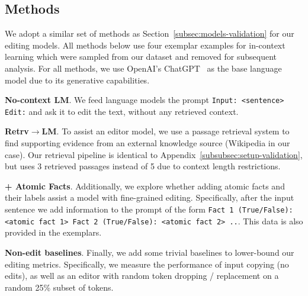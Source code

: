\documentclass[11pt]{article}
\newcommand{\rtgShort}{Retrv$\rightarrow$LM}
\begin{document}
\subsection{Methods}\label{subsubsec:editing-methods}

We adopt a similar set of methods as Section~\ref{subsec:models-validation} for our editing models. All methods below use four exemplar examples for in-context learning which were sampled from our dataset and removed for subsequent analysis. For all methods, we use OpenAI's ChatGPT~\citep{chatgpt} as the base language model due to its generative capabilities.
\vspace{.3em}

\noindent \textbf{No-context LM}. We feed language models the prompt \texttt{Input: <sentence> Edit:} and ask it to edit the text, without any retrieved context. 

\vspace{.3em}

\noindent \textbf{\rtgShort}. To assist an editor model, we use a passage retrieval system to find supporting evidence from an external knowledge source (Wikipedia in our case). Our retrieval pipeline is identical to Appendix~\ref{subsubsec:setup-validation}, but uses 3 retrieved passages instead of 5 due to context length restrictions.

\vspace{.3em}

\noindent \textbf{+ Atomic Facts}. Additionally, we explore whether adding atomic facts and their labels assist a model with fine-grained editing. Specifically, after the input sentence we add information to the prompt of the form \texttt{Fact 1 (True/False): <atomic fact 1> Fact 2 (True/False): <atomic fact 2> ..}. This data is also provided in the exemplars.

\vspace{.3em}

\noindent \textbf{Non-edit baselines}. Finally, we add some trivial baselines to lower-bound our editing metrics. Specifically, we measure the performance of input copying (no edits), as well as an editor with random token dropping / replacement on a random 25\% subset of tokens.

\end{document}
